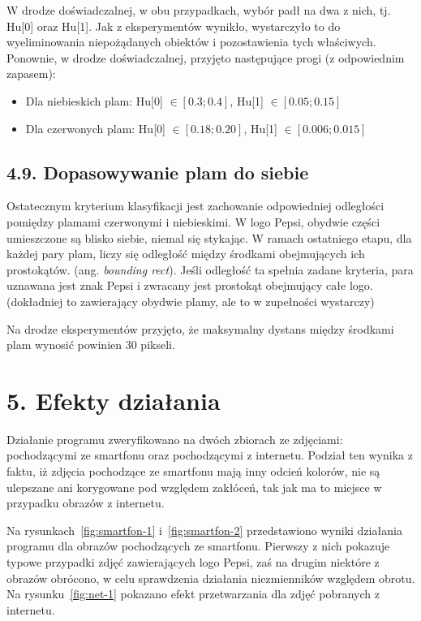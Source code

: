 \documentclass[11pt,a4paper,twoside]{report}
\begin{document}
			W drodze doświadczalnej, w obu przypadkach, wybór padł na dwa z nich, tj. Hu[0] oraz Hu[1]. Jak z eksperymentów wynikło, wystarczyło to do wyeliminowania niepożądanych obiektów i pozostawienia tych właściwych. Ponownie, w drodze doświadczalnej, przyjęto następujące progi (z odpowiednim zapasem):

			\begin{itemize}
				\item Dla niebieskich plam: Hu[0] $\in [0.3; 0.4]$, Hu[1] $\in [0.05; 0.15]$
				\item Dla czerwonych plam: Hu[0] $\in [0.18; 0.20]$, Hu[1] $\in [0.006; 0.015]$
			\end{itemize}

	\subsection*{4.9. Dopasowywanie plam do siebie}

			Ostatecznym kryterium klasyfikacji jest zachowanie odpowiedniej odległości pomiędzy plamami czerwonymi i niebieskimi. W logo Pepsi, obydwie części umieszczone są blisko siebie, niemal się stykając. W ramach ostatniego etapu, dla każdej pary plam, liczy się odległość między środkami obejmujących ich prostokątów. (ang. \emph{bounding rect}). Jeśli odległość ta spełnia zadane kryteria, para uznawana jest znak Pepsi i zwracany jest prostokąt obejmujący całe logo. (dokładniej to zawierający obydwie plamy, ale to w zupełności wystarczy)

			Na drodze eksperymentów przyjęto, że maksymalny dystans między środkami plam wynosić powinien 30 pikseli.

\section*{5. Efekty działania}

	Działanie programu zweryfikowano na dwóch zbiorach ze zdjęciami: pochodzącymi ze smartfonu oraz pochodzącymi z internetu. Podział ten wynika z faktu, iż zdjęcia pochodzące ze smartfonu mają inny odcień kolorów, nie są ulepszane ani korygowane pod względem zakłóceń, tak jak ma to miejsce w przypadku obrazów z internetu.

	Na rysunkach~\ref{fig:smartfon-1} i~\ref{fig:smartfon-2} przedstawiono wyniki działania programu dla obrazów pochodzących ze smartfonu. Pierwszy z nich pokazuje typowe przypadki zdjęć zawierających logo Pepsi, zaś na drugim niektóre z obrazów obrócono, w celu sprawdzenia działania niezmienników względem obrotu. Na rysunku~\ref{fig:net-1} pokazano efekt przetwarzania dla zdjęć pobranych z internetu.
\end{document}
